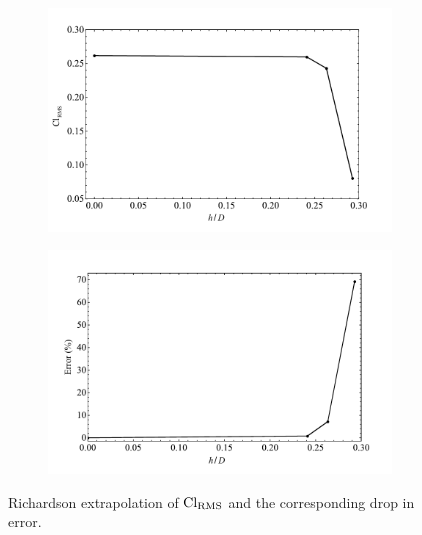 \documentclass[oneside]{utmthesis}
\begin{document}
\begin{figure}
  \centering
  \begin{subfigure}[h]{1\textwidth}
    \includegraphics[width=\textwidth]{figs/gciClrms-1}
    \caption{}
    \label{fig:gciClrms-1}
  \end{subfigure}

  \begin{subfigure}[h]{1\textwidth}
    \includegraphics[width=\textwidth]{figs/gciClrms-2}
    \caption{}
    \label{fig:gciClrms-2}
  \end{subfigure}
  \caption{Richardson extrapolation of $\text{Cl}_{\text{RMS}}$ and the corresponding drop in error.} \label{fig:gciClrms}
\end{figure}
\end{document}
